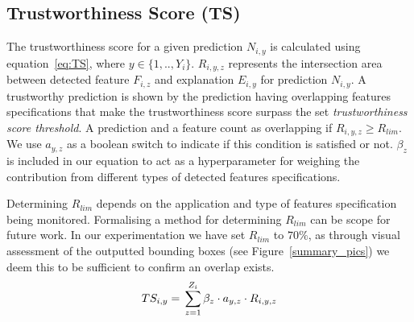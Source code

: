 \subsection{Trustworthiness Score (TS)}\label{TS_section}
The trustworthiness score for a given prediction $N_{i,y}$ is calculated using equation~\ref{eq:TS}, where $y\in\{1,..,Y_i\}$. 
%
$R_{i,y,z}$ represents the intersection area between detected feature $F_{i,z}$ and explanation $E_{i,y}$ for prediction $N_{i,y}$. 
%
A trustworthy prediction is shown by the prediction having overlapping features specifications that make the trustworthiness score surpass the set \textit{trustworthiness score threshold}. 
%
A prediction and a feature count as overlapping if $R_{i,y,z} \geq R_{lim}$. We use $a_{y,z}$ as a boolean switch to indicate if this condition is satisfied or not. $\beta_z$ is included in our equation to act as a hyperparameter for weighing the contribution from different types of detected features specifications.

Determining $R_{lim}$ depends on the application and type of features specification being monitored. Formalising a method for determining $R_{lim}$ can be scope for future work. In our experimentation we have set $R_{lim}$ to $70\%$, as through visual assessment of the outputted bounding boxes (see Figure~\ref{summary_pics}) we deem this to be sufficient to confirm an overlap exists.   
\begin{equation}
\label{eq:TS}
    TS_{i,y} = \sideset{}{}\sum_{z=1}^{Z_i} \beta_z \cdot a_{y,z} \cdot R_{i,y,z}%
\end{equation}

